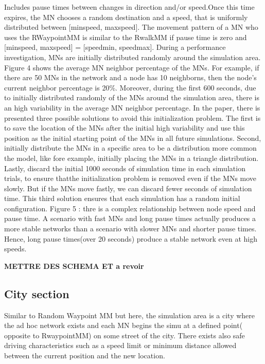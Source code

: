 Includes pause times between changes in direction and/or speed.Once this time expires, the MN chooses a random destination and a speed, that is uniformly distributed between [minspeed, maxspeed]. The movement pattern of a MN who uses the RWaypointMM is similar to the RwalkMM if pause time is zero and [minspeed, maxspeed] = [speedmin, speedmax].
During a performance investigation, MNs are initially distributed randomly around the simulation area. Figure 4 shows the average MN neighbor percentage of the MNs. For example, if there are 50 MNs in the network and a node has 10 neighborns, then the node's current neighbor percentage is 20\%. Moreover, during the first 600 seconds, due to initially distributed randomly of the MNs around the simulation area, there is an high variability in the average MN neighbor percentage.
In the paper, there is presented three possible solutions to avoid this initialization problem. The first is to save the location of the MNs after the initial high variability and use this position as the initial starting point of the MNs in all future simulations. Second, initially distribute the MNs in a specific area to be a distribution more common the model, like fore example, initially placing the MNs in a triangle distribution. Lastly, discard the initial 1000 seconds of simulation time in each simulation trials, to ensure thatthe initialization problem is removed even if the MNs move slowly. But if the MNs move fastly, we can discard fewer seconds of simulation time. This third solution ensures that each simulation has a random initial configuration.
Figure 5 : thre is a complex relationship between node speed and pause time. A scenario with fast MNs and long pause times actually produces a more stable networks than a scenario with slower MNs and shorter pause times. Hence, long pause times(over 20 seconds) produce a stable network even at high speeds.

\textbf{METTRE DES SCHEMA ET a revoir}

\subsection{City section}

Similar to Random Waypoint MM but here, the simulation area is a city where the ad hoc network exists and each MN begins the simu at a defined point( opposite to RwaypointMM) on some street of the city. There exists also safe driving characteristics such as a speed limit or minimum distance allowed between the current position and the new location.

